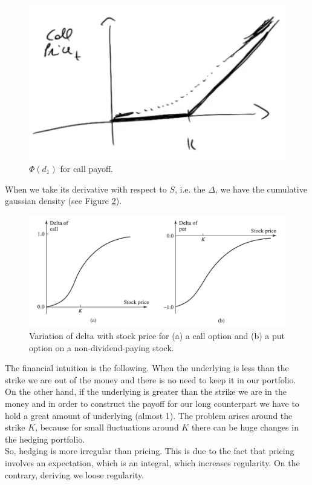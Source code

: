 \begin{figure}[htp]
    \centering
    \includegraphics[scale=0.3]{fig/tmp/fig12.png}
    \caption{$\Phi(d_1)$ for call payoff.}
    \label{fig:priced}
\end{figure}
When we take its derivative with respect to $S$, i.e. the $\Delta$, we have the cumulative gaussian density (see Figure \ref{fig:delta}).
\begin{figure}[htp]
    \centering
    \includegraphics[scale=0.2]{fig/tmp/fig13.png}
    \caption{Variation of delta with stock price for (a) a call option and (b) a put option on a non-dividend-paying stock.}
    \label{fig:delta}
\end{figure}
The financial intuition is the following. When the underlying is less than the strike we are out of the money and there is no need to keep it in our portfolio. On the other hand, if the underlying is greater than the strike we are in the money and in order to construct the payoff for our long counterpart we have to hold a great amount of underlying (almost 1). The problem arises around the strike $K$, because for small fluctuations around $K$ there can be huge changes in the hedging portfolio.\\
So, hedging is more irregular than pricing. This is due to the fact that pricing involves an expectation, which is an integral, which increases regularity. On the contrary, deriving we loose regularity.\\
\\
